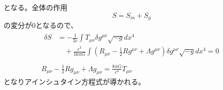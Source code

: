     となる。全体の作用
        \[S = S_m + S_g\]
    の変分が0となるので、
    \begin{gather*}
        \begin{aligned}
            \delta S
                &= -\frac{1}{2c} \int T_{\mu\nu} \delta g^{\mu\nu} \sqrt{-g} dx^4\\
                &\quad + \frac{c^3}{16\pi G} \int \left(R_{\mu\nu} - \frac{1}{2}Rg^{\mu\nu} + \Lambda g^{\mu\nu}\right) \delta g^{\mu\nu} \sqrt{-g} dx^4 = 0\\
        \end{aligned}\\
        R_{\mu\nu} - \frac{1}{2}Rg_{\mu\nu} + \Lambda g_{\mu\nu} = \frac{8\pi G}{c^4}T_{\mu\nu}
    \end{gather*}
    となりアインシュタイン方程式が導かれる。